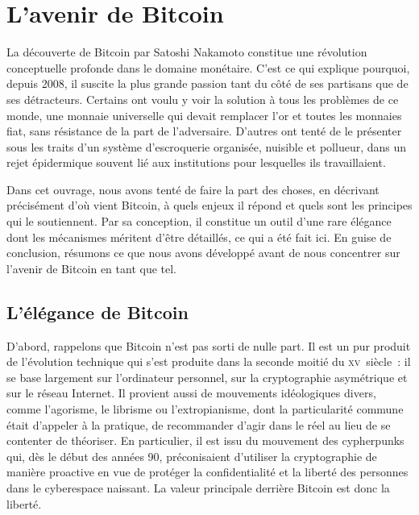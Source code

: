
\chapter{L'avenir de Bitcoin} %
\label{ch:avenir}


La découverte de Bitcoin par Satoshi Nakamoto constitue une révolution conceptuelle profonde dans le domaine monétaire. C'est ce qui explique pourquoi, depuis 2008, il suscite la plus grande passion tant du côté de ses partisans que de ses détracteurs. Certains ont voulu y voir la solution à tous les problèmes de ce monde, une monnaie universelle qui devait remplacer l'or et toutes les monnaies fiat, sans résistance de la part de l'adversaire. D'autres ont tenté de le présenter sous les traits d'un système d'escroquerie organisée, nuisible et pollueur, dans un rejet épidermique souvent lié aux institutions pour lesquelles ils travaillaient.

Dans cet ouvrage, nous avons tenté de faire la part des choses, en décrivant précisément d'où vient Bitcoin, à quels enjeux il répond et quels sont les principes qui le soutiennent. Par sa conception, il constitue un outil d'une rare élégance dont les mécanismes méritent d'être détaillés, ce qui a été fait ici. En guise de conclusion, résumons ce que nous avons développé avant de nous concentrer sur l'avenir de Bitcoin en tant que tel. %

\section*{L'élégance de Bitcoin}


D'abord, rappelons que Bitcoin n'est pas sorti de nulle part. Il est un pur produit de l'évolution technique qui s'est produite dans la seconde moitié du \textsc{xv}\ieme{}~siècle~: il se base largement sur l'ordinateur personnel, sur la cryptographie asymétrique et sur le réseau Internet. Il provient aussi de mouvements idéologiques divers, comme l'agorisme, le librisme ou l'extropianisme, dont la particularité commune était d'appeler à la pratique, de recommander d'agir dans le réel au lieu de se contenter de théoriser. En particulier, il est issu du mouvement des cypherpunks qui, dès le début des années 90, préconisaient d'utiliser la cryptographie de manière proactive en vue de protéger la confidentialité et la liberté des personnes dans le cyberespace naissant. La valeur principale derrière Bitcoin est donc la liberté.

